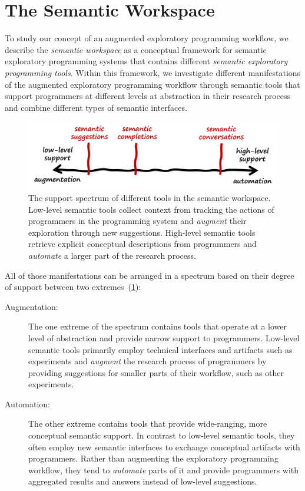 
\section{The Semantic Workspace}
\label{sec:approach/workspace}

To study our concept of an augmented exploratory programming workflow, we describe the \emph{semantic workspace} as a conceptual framework for semantic exploratory programming systems that contains different \emph{semantic exploratory programming tools}.
Within this framework, we investigate different manifestations of the augmented exploratory programming workflow through semantic tools that support programmers at different levels at abstraction in their research process and combine different types of semantic interfaces.

\begin{figure}
	\centering
	\includegraphics[width=.85\textwidth]{02_workspace/spectrum.png}
	\caption[The support spectrum of different semantic tools in the semantic workspace.]{
		The support spectrum of different tools in the semantic workspace.
		Low-level semantic tools collect context from tracking the actions of programmers in the programming system and \emph{augment} their exploration through new suggestions.
		High-level semantic tools retrieve explicit conceptual descriptions from programmers and \emph{automate} a larger part of the research process.
	}
	\label{fig:approach/workspace/spectrum}
\end{figure}

All of those manifestations can be arranged in a spectrum based on their degree of support between two extremes~(\cref{fig:approach/workspace/spectrum}):

\begin{description}
	\item[Augmentation:]
	The one extreme of the spectrum contains tools that operate at a lower level of abstraction and provide narrow support to programmers.
	Low-level semantic tools primarily employ technical interfaces and artifacts such as experiments and \emph{augment} the research process of programmers by providing suggestions for smaller parts of their workflow, such as other experiments.

	\item[Automation:]
	The other extreme contains tools that provide wide-ranging, more conceptual semantic support.
	In contrast to low-level semantic tools, they often employ new semantic interfaces to exchange conceptual artifacts with programmers.
	Rather than augmenting the exploratory programming workflow, they tend to \emph{automate} parts of it and provide programmers with aggregated results and answers instead of low-level suggestions.
\end{description}

